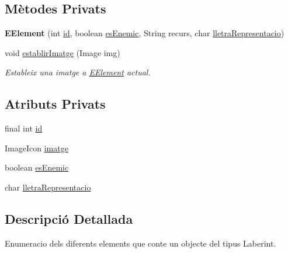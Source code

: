\subsection*{Mètodes Privats}
\begin{DoxyCompactItemize}
\item 
\hypertarget{enumlogica_1_1enumeracions_1_1_e_element_a7f82884a5d1f6722079c7ea099dd14ac}{{\bfseries E\+Element} (int \hyperlink{enumlogica_1_1enumeracions_1_1_e_element_a276fc494132bca06ef0e2e8490888a01}{id}, boolean \hyperlink{enumlogica_1_1enumeracions_1_1_e_element_acd29ca18716c824e7921d94725497671}{es\+Enemic}, String recurs, char \hyperlink{enumlogica_1_1enumeracions_1_1_e_element_ada6d33c50cdcf99a08d6bf74c114151d}{lletra\+Representacio})}\label{enumlogica_1_1enumeracions_1_1_e_element_a7f82884a5d1f6722079c7ea099dd14ac}

\item 
void \hyperlink{enumlogica_1_1enumeracions_1_1_e_element_afc1ffbd8df4bac762f581cb1dc2eb314}{establir\+Imatge} (Image img)
\begin{DoxyCompactList}\small\item\em Estableix una imatge a \hyperlink{enumlogica_1_1enumeracions_1_1_e_element}{E\+Element} actual. \end{DoxyCompactList}\end{DoxyCompactItemize}
\subsection*{Atributs Privats}
\begin{DoxyCompactItemize}
\item 
final int \hyperlink{enumlogica_1_1enumeracions_1_1_e_element_a276fc494132bca06ef0e2e8490888a01}{id}
\item 
Image\+Icon \hyperlink{enumlogica_1_1enumeracions_1_1_e_element_a88d2ec584346f09066becb195b96d8a9}{imatge}
\item 
boolean \hyperlink{enumlogica_1_1enumeracions_1_1_e_element_acd29ca18716c824e7921d94725497671}{es\+Enemic}
\item 
char \hyperlink{enumlogica_1_1enumeracions_1_1_e_element_ada6d33c50cdcf99a08d6bf74c114151d}{lletra\+Representacio}
\end{DoxyCompactItemize}


\subsection{Descripció Detallada}
Enumeracio dels diferents elements que conte un objecte del tipus Laberint. 

